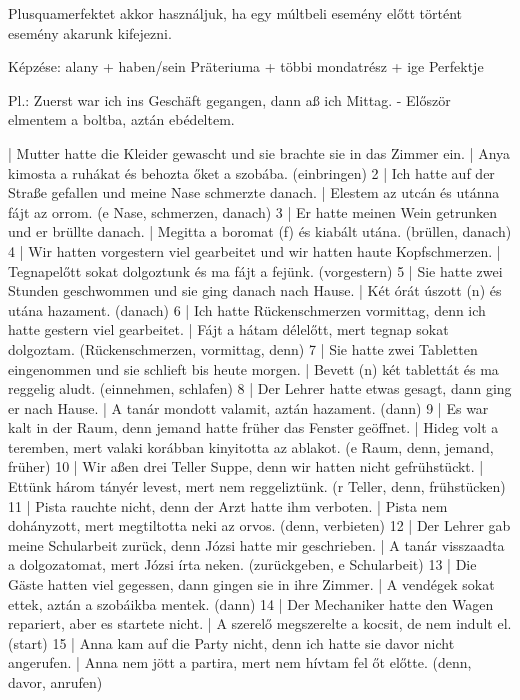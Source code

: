 \documentclass{article}
\newenvironment{desc}{\verbatim}{\endverbatim}
\newenvironment{exmp}{\verbatim}{\endverbatim}
\begin{document}
\begin{desc}
Plusquamerfektet akkor használjuk, ha egy múltbeli esemény előtt történt esemény akarunk kifejezni.

Képzése:
alany + haben/sein Präteriuma + többi mondatrész + ige Perfektje

Pl.: Zuerst war ich ins Geschäft gegangen, dann aß ich Mittag. - Először elmentem a boltba, aztán ebédeltem.
\end{desc}

\begin{exmp}
1 | Mutter hatte die Kleider gewascht und sie brachte sie in das Zimmer ein. | Anya kimosta a ruhákat és behozta őket a szobába. (einbringen)
2 | Ich hatte auf der Straße gefallen und meine Nase schmerzte danach. | Elestem az utcán és utánna fájt az orrom. (e Nase, schmerzen, danach)
3 | Er hatte meinen Wein getrunken und er brüllte danach. | Megitta a boromat (f) és kiabált utána. (brüllen, danach)
4 | Wir hatten vorgestern viel gearbeitet und wir hatten haute Kopfschmerzen. | Tegnapelőtt sokat dolgoztunk és ma fájt a fejünk. (vorgestern)
5 | Sie hatte zwei Stunden geschwommen und sie ging danach nach Hause. | Két órát úszott (n) és utána hazament. (danach)
6 | Ich hatte Rückenschmerzen vormittag, denn ich hatte gestern viel gearbeitet. | Fájt a hátam délelőtt, mert tegnap sokat dolgoztam. (Rückenschmerzen, vormittag, denn)
7 | Sie hatte zwei Tabletten eingenommen und sie schlieft bis heute morgen. | Bevett (n) két tablettát és ma reggelig aludt. (einnehmen, schlafen)
8 | Der Lehrer hatte etwas gesagt, dann ging er nach Hause. | A tanár mondott valamit, aztán hazament. (dann)
9 | Es war kalt in der Raum, denn jemand hatte früher das Fenster geöffnet. | Hideg volt a teremben, mert valaki korábban kinyitotta az ablakot. (e Raum, denn, jemand, früher)
10 | Wir aßen drei Teller Suppe, denn wir hatten nicht gefrühstückt. | Ettünk három tányér levest, mert nem reggeliztünk. (r Teller, denn, frühstücken)
11 | Pista rauchte nicht, denn der Arzt hatte ihm verboten. | Pista nem dohányzott, mert megtiltotta neki az orvos. (denn, verbieten)
12 | Der Lehrer gab meine Schularbeit zurück, denn Józsi hatte mir geschrieben. | A tanár visszaadta a dolgozatomat, mert Józsi írta neken. (zurückgeben, e Schularbeit)
13 | Die Gäste hatten viel gegessen, dann gingen sie in ihre Zimmer. | A vendégek sokat ettek, aztán a szobáikba mentek. (dann)
14 | Der Mechaniker hatte den Wagen repariert, aber es startete nicht. | A szerelő megszerelte a kocsit, de nem indult el. (start)
15 | Anna kam auf die Party nicht, denn ich hatte sie davor nicht angerufen. | Anna nem jött a partira, mert nem hívtam fel őt előtte. (denn, davor, anrufen)
\end{exmp}
\end{document}
